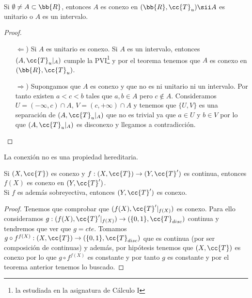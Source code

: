 \begin{coro}
    Si $\emptyset\neq A \subset \bb{R}$, entonces $A$ es conexo en $(\bb{R}, \cc{T}_u)\sii A$ es unitario o $A$ es un intervalo.

    \begin{proof}\
        \begin{itemize}
            \item[$\Leftarrow$)] Si $A$ es unitario es conexo. Si $A$ es un intervalo, entonces $(A, \cc{T}_u|_A)$ cumple la PVI\footnote{la estudiada en la asignatura de Cálculo I} y por el teorema tenemos que $A$ es conexo en $(\bb{R}, \cc{T}_u)$.
            \item[$\Rightarrow$)] Supongamos que $A$ es conexo y que no es ni unitario ni un intervalo. Por tanto existen $a<c<b$ tales que $a,b\in A$ pero $c\notin A$. Consideramos $U=(-\infty, c)\cap A$, $V=(c, +\infty)\cap A$ y tenemos que $\{U,V\}$ es una separación de $(A, \cc{T}_u|_A)$ que no es trivial ya que $a\in U$ y $b\in V$ por lo que $(A, \cc{T}_u|_A)$ es disconexo y llegamos a contradicción.
        \end{itemize}
    \end{proof}
\end{coro}

\begin{observacion}
    La conexión no es una propiedad hereditaria.
    \endsquare
\end{observacion}

\begin{coro}
    Si $(X, \cc{T})$ es conexo y $f:(X, \cc{T})\to (Y, \cc{T}')$ es continua, entonces $f(X)$ es conexo en $(Y, \cc{T}')$. \\
    
    Si $f$ es además sobreyectiva, entonces $(Y, \cc{T}')$ es conexo.
    \begin{proof}
        Tenemos que comprobar que $(f(X), \cc{T}'|_{f(X)})$ es conexo. Para ello consideramos $g:(f(X), \cc{T}'|_{f(X)})\to (\{0,1\}, \cc{T}_{disc})$ continua y tendremos que ver que $g=cte$. Tomamos $g\circ f^{f(X)}:(X, \cc{T})\to (\{0,1\}, \cc{T}_{disc})$ que es continua (por ser composición de continuas) y además, por hipótesis tenemos que $(X, \cc{T})$ es conexo por lo que $g\circ f^{f(X)}$ es constante y por tanto $g$ es constante y por el teorema anterior tenemos lo buscado.
    \end{proof}
\end{coro}

